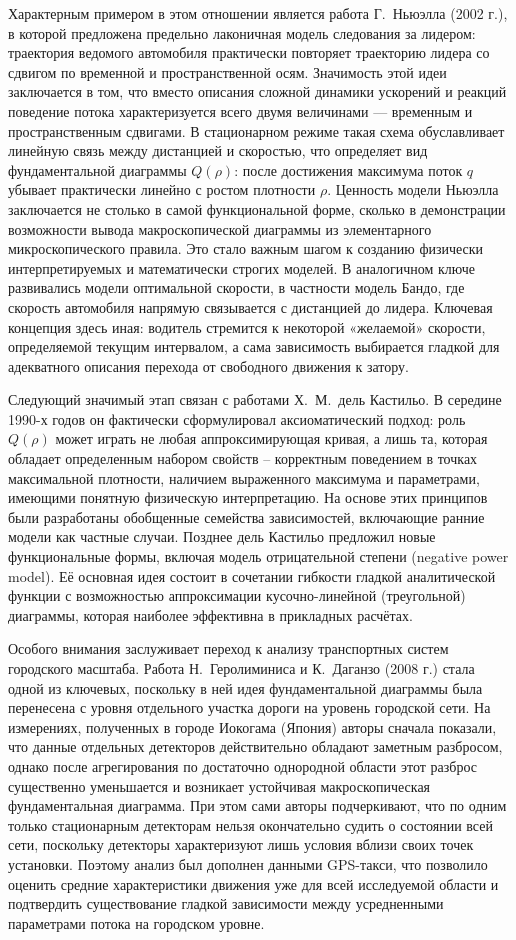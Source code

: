 \documentclass[12pt,a4paper]{article}
\begin{document}
Характерным примером в этом отношении является работа Г.~Ньюэлла (2002 г.), в которой предложена предельно лаконичная модель следования за лидером: траектория ведомого автомобиля практически повторяет траекторию лидера со сдвигом по временной и пространственной осям. Значимость этой идеи заключается в том, что вместо описания сложной динамики ускорений и реакций поведение потока характеризуется всего двумя величинами --- временным и пространственным сдвигами. В стационарном режиме такая схема обуславливает линейную связь между дистанцией и скоростью, что определяет вид фундаментальной диаграммы $Q(\rho)$: после достижения максимума поток $q$ убывает практически линейно с ростом плотности $\rho$. Ценность модели Ньюэлла заключается не столько в самой функциональной форме, сколько в демонстрации возможности вывода макроскопической диаграммы из элементарного микроскопического правила. Это стало важным шагом к созданию физически интерпретируемых и математически строгих моделей. В аналогичном ключе развивались модели оптимальной скорости, в частности модель Бандо, где скорость автомобиля напрямую связывается с дистанцией до лидера. Ключевая концепция здесь иная: водитель стремится к некоторой «желаемой» скорости, определяемой текущим интервалом, а сама зависимость выбирается гладкой для адекватного описания перехода от свободного движения к затору.

Следующий значимый этап связан с работами Х.~М.~дель Кастильо. В середине 1990-х годов он фактически сформулировал аксиоматический подход: роль $Q(\rho)$ может играть не любая аппроксимирующая кривая, а лишь та, которая обладает определенным набором свойств -- корректным поведением в точках максимальной плотности, наличием выраженного максимума и параметрами, имеющими понятную физическую интерпретацию. На основе этих принципов были разработаны обобщенные семейства зависимостей, включающие ранние модели как частные случаи. Позднее дель Кастильо предложил новые функциональные формы, включая модель отрицательной степени (negative power model). Её основная идея состоит в сочетании гибкости гладкой аналитической функции с возможностью аппроксимации кусочно-линейной (треугольной) диаграммы, которая наиболее эффективна в прикладных расчётах.

Особого внимания заслуживает переход к анализу транспортных систем городского масштаба. Работа Н.~Геролиминиса и К.~Даганзо (2008 г.) стала одной из ключевых, поскольку в ней идея фундаментальной диаграммы была перенесена с уровня отдельного участка дороги на уровень городской сети. На измерениях, полученных в городе Иокогама (Япония) авторы сначала показали, что данные отдельных детекторов действительно обладают заметным разбросом, однако после агрегирования по достаточно однородной области этот разброс существенно уменьшается и возникает устойчивая макроскопическая фундаментальная диаграмма. При этом сами авторы подчеркивают, что по одним только стационарным детекторам нельзя окончательно судить о состоянии всей сети, поскольку детекторы характеризуют лишь условия вблизи своих точек установки. Поэтому анализ был дополнен данными GPS-такси, что позволило оценить средние характеристики движения уже для всей исследуемой области и подтвердить существование гладкой зависимости между усредненными параметрами потока на городском уровне.
\end{document}
